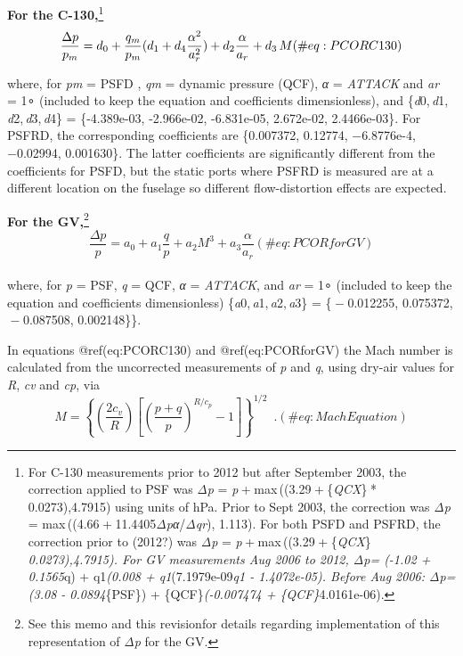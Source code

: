 \documentclass[
  english,
]{book}
\begin{document}
\textbf{For the C-130,}\footnote{For C-130 measurements prior to 2012
  but after September 2003, the correction applied to PSF was
  \emph{Δp} = \emph{p} + max ((3.29 + \{\emph{QCX}\} * 0.0273),4.7915)
  using units of hPa. Prior to Sept 2003, the correction was
  {\emph{Δp} = max ((4.66 + 11.4405\emph{Δp}\emph{α}/\emph{Δq}\emph{r}}),
  1.113). For both PSFD and PSFRD, the correction prior to (2012?) was
  {\emph{Δp} = \emph{p} + max ((3.29 + \{\emph{QCX}\} \emph{ 0.0273),4.7915).
  For GV measurements Aug 2006 to 2012, {\emph{Δp}=} (-1.02 + 0.1565}}q)
  + q1{\emph{(0.008 + q1}}(7.1979e-09{\emph{q1 - 1.4072e-05). Before Aug
  2006: {\emph{Δp}=}(3.08 - 0.0894}}\{PSF\}) + \{QCF\}{\emph{(-0.007474
  + \{QCF\}}}4.0161e-06).} \begin{equation}
\frac{\Delta p}{p_{m}}=d_{0}+\frac{q_{m}}{p_{m}}(d_{1}+d_{4}\frac{\alpha^{2}}{a_{r}^{2}})+d_{2}\frac{\alpha}{a_{r}}+d_{3}\thinspace M
(\#eq:PCORC130)
\end{equation}

where, for {\emph{p}\emph{m}} = PSFD , {\emph{q}\emph{m}} = dynamic
pressure (QCF), {\emph{α} = \emph{ATTACK}} and {\emph{a}\emph{r} = 1∘}
(included to keep the equation and coefficients dimensionless), and
\{{\emph{d}0, \emph{d}1, \emph{d}2, \emph{d}3, \emph{d}4}\} =
\{-4.389e-03, -2.966e-02, -6.831e-05, 2.672e-02, 2.4466e-03\}. For
PSFRD, the corresponding coefficients are \{0.007372, 0.12774,
{−}6.8776e-4, {−}0.02994, 0.001630\}. The latter coefficients are
significantly different from the coefficients for PSFD, but the static
ports where PSFRD is measured are at a different location on the
fuselage so different flow-distortion effects are expected.

\textbf{For the GV,}\footnote{See this memo and this revisionfor details
  regarding implementation of this representation of {\emph{Δp}} for the
  GV.} \begin{equation}
\frac{\Delta p}{p}=a_{0}+a_{1}\frac{q}{p}+a_{2}M^{3}+a_{3}\frac{\alpha}{a_{r}}
(\#eq:PCORforGV)
\end{equation}\\
where, for {\emph{p}} = PSF, {\emph{q}} = QCF,
{\emph{α} = \emph{ATTACK}}, and {\emph{a}\emph{r} = 1∘} (included to
keep the equation and coefficients dimensionless)
\{{\emph{a}0, \emph{a}1, \emph{a}2, \emph{a}3}\} = \{{ − 0.012255},
{0.075372}, { − 0.087508}, {0.002148}\}\}.

In equations @ref(eq:PCORC130) and @ref(eq:PCORforGV) the Mach number is
calculated from the uncorrected measurements of {\emph{p}} and
{\emph{q}}, using dry-air values for {\emph{R}}, {\emph{c}\emph{v}} and
{\emph{c}\emph{p}}, via\\
\begin{equation}
M=\left\{ \left(\frac{2c_{v}}{R}\right)\left[\left(\frac{p+q}{p}\right)^{R/c_{p}}-1\right]\right\}^{1/2}\,\,\,.
(\#eq:MachEquation)
\end{equation}
\end{document}

